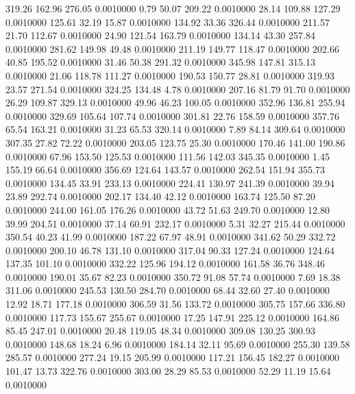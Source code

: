  319.26  162.96  276.05   0.0010000
   0.79   50.07  209.22   0.0010000
  28.14  109.88  127.29   0.0010000
 125.61   32.19   15.87   0.0010000
 134.92   33.36  326.44   0.0010000
 211.57   21.70  112.67   0.0010000
  24.90  121.54  163.79   0.0010000
 134.14   43.30  257.84   0.0010000
 281.62  149.98   49.48   0.0010000
 211.19  149.77  118.47   0.0010000
 202.66   40.85  195.52   0.0010000
  31.46   50.38  291.32   0.0010000
 345.98  147.81  315.13   0.0010000
  21.06  118.78  111.27   0.0010000
 190.53  150.77   28.81   0.0010000
 319.93   23.57  271.54   0.0010000
 324.25  134.48    4.78   0.0010000
 207.16   81.79   91.70   0.0010000
  26.29  109.87  329.13   0.0010000
  49.96   46.23  100.05   0.0010000
 352.96  136.81  255.94   0.0010000
 329.69  105.64  107.74   0.0010000
 301.81   22.76  158.59   0.0010000
 357.76   65.54  163.21   0.0010000
  31.23   65.53  320.14   0.0010000
   7.89   84.14  309.64   0.0010000
 307.35   27.82   72.22   0.0010000
 203.05  123.75   25.30   0.0010000
 170.46  141.00  190.86   0.0010000
  67.96  153.50  125.53   0.0010000
 111.56  142.03  345.35   0.0010000
   1.45  155.19   66.64   0.0010000
 356.69  124.64  143.57   0.0010000
 262.54  151.94  355.73   0.0010000
 134.45   33.91  233.13   0.0010000
 224.41  130.97  241.39   0.0010000
  39.94   23.89  292.74   0.0010000
 202.17  134.40   42.12   0.0010000
 163.74  125.50   87.20   0.0010000
 244.00  161.05  176.26   0.0010000
  43.72   51.63  249.70   0.0010000
  12.80   39.99  204.51   0.0010000
  37.14   60.91  232.17   0.0010000
   5.31   32.27  215.44   0.0010000
 350.54   40.23   41.99   0.0010000
 187.22   67.97   48.91   0.0010000
 341.62   50.29  332.72   0.0010000
 200.10   46.78  131.10   0.0010000
 317.04   90.33  127.24   0.0010000
 124.64  137.35  101.10   0.0010000
 332.22  125.96  194.12   0.0010000
 161.58   36.76  348.46   0.0010000
 190.01   35.67   82.23   0.0010000
 350.72   91.08   57.74   0.0010000
   7.69   18.38  311.06   0.0010000
 245.53  130.50  284.70   0.0010000
  68.44   32.60   27.40   0.0010000
  12.92   18.71  177.18   0.0010000
 306.59   31.56  133.72   0.0010000
 305.75  157.66  336.80   0.0010000
 117.73  155.67  255.67   0.0010000
  17.25  147.91  225.12   0.0010000
 164.86   85.45  247.01   0.0010000
  20.48  119.05   48.34   0.0010000
 309.08  130.25  300.93   0.0010000
 148.68   18.24    6.96   0.0010000
 184.14   32.11   95.69   0.0010000
 255.30  139.58  285.57   0.0010000
 277.24   19.15  205.99   0.0010000
 117.21  156.45  182.27   0.0010000
 101.47   13.73  322.76   0.0010000
 303.00   28.29   85.53   0.0010000
  52.29   11.19   15.64   0.0010000
